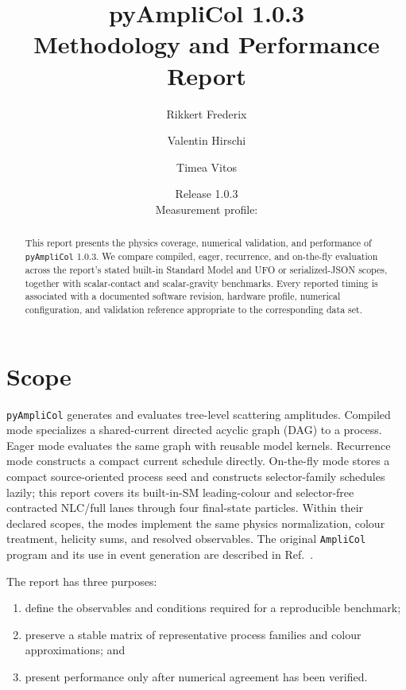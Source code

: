 \documentclass[10pt,letterpaper]{article}
\title{\vspace{-1.4cm}\textbf{pyAmpliCol 1.0.3}\\[0.35em]
  \Large Methodology and Performance Report}
\author{Rikkert Frederix \and Valentin Hirschi \and Timea Vitos}
\date{Release 1.0.3\\[0.25em]\small Measurement profile:
  \texttt{\ReportProfileName}}
\newcommand{\PAC}{\texttt{pyAmpliCol}}
\newcommand{\AC}{\texttt{AmpliCol}}
\begin{document}
\maketitle

\begin{abstract}
This report presents the physics coverage, numerical validation, and
performance of \PAC{} 1.0.3. We compare compiled, eager, recurrence, and
on-the-fly evaluation across the report's stated built-in Standard Model and
UFO or serialized-JSON scopes, together with scalar-contact and scalar-gravity
benchmarks. Every reported
timing is associated with a documented software revision, hardware profile,
numerical configuration, and validation reference appropriate to the
corresponding data set.
\end{abstract}

\begingroup
\small
\setlength{\parskip}{0pt}
\tableofcontents
\endgroup
\clearpage

\section{Scope}

\PAC{} generates and evaluates tree-level scattering amplitudes. Compiled mode
specializes a shared-current directed acyclic graph (DAG) to a process. Eager
mode evaluates the same graph with reusable model kernels. Recurrence mode
constructs a compact current schedule directly. On-the-fly mode stores a
compact source-oriented process seed and constructs selector-family schedules
lazily; this report covers its built-in-SM leading-colour and selector-free
contracted NLC/full lanes through four final-state particles. Within their
declared scopes, the modes implement the
same physics normalization, colour treatment, helicity sums, and resolved
observables. The original \AC{} program and its use in event generation are
described in Ref.~\cite{FrederixVitos2026}.

The report has three purposes:
\begin{enumerate}
  \item define the observables and conditions required for a reproducible
        benchmark;
  \item preserve a stable matrix of representative process families and colour
        approximations; and
  \item present performance only after numerical agreement has been verified.
\end{enumerate}
\end{document}

